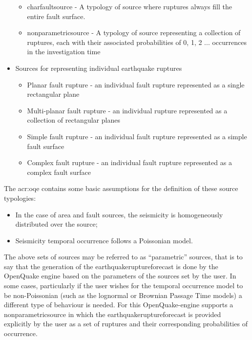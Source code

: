 \begin{itemize}
\begin{itemize}
        \item \Gls{charfaultsource} - A typology of source where ruptures
        always fill the entire fault surface.
        
        \item \Gls{nonparametricsource} - A typology of source representing
        a collection of ruptures, each with their associated probabilities
        of 0, 1, 2 ... occurrences in the investigation time

    \end{itemize}

    \item Sources for representing individual earthquake ruptures
    
    \begin{itemize}
        \item Planar fault rupture - an individual fault rupture represented as a single rectangular plane
        \item Multi-planar fault rupture - an individual rupture represented as a collection of rectangular planes
        \item Simple fault rupture - an individual fault rupture represented as a simple fault surface
        \item Complex fault rupture - an individual fault rupture represented as a complex fault surface
    \end{itemize}

\end{itemize}

The \glsdesc{acr:oqe} contains some basic assumptions for the definition of
these source typologies:

\begin{itemize}

    \item In the case of area and fault sources, the seismicity is
    homogeneously distributed over the source;

    \item Seismicity temporal occurrence follows a Poissonian model.

\end{itemize}

The above sets of sources may be referred to as ``parametric'' sources, that
is to say that the generation of the \Gls{earthquakeruptureforecast} is done
by the OpenQuake engine based on the parameters of the sources set by the
user. In some cases, particularly if the user wishes for the temporal
occurrence model to be non-Poissonian (such as the lognormal or Brownian
Passage Time models) a different type of behaviour is needed. For this
OpenQuake-engine supports a \Gls{nonparametricsource} in which the
\Gls{earthquakeruptureforecast} is provided explicitly by the user as a set of
ruptures and their corresponding probabilities of occurrence.

